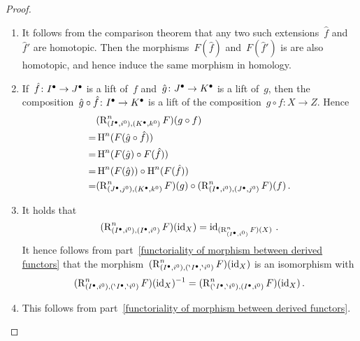 \begin{proof}
  \leavevmode
  \begin{enumerate}
    \item
      It follows from the comparison theorem that any two such extensions~$\hat{f}$ and~$\hat{f}'$ are homotopic.
      Then the morphisms~$F(\hat{f})$ and~$F(\hat{f}')$ is are also homotopic, and hence induce the same morphism in homology.
    \item
      If~$\hat{f} \colon I^\bullet \to J^\bullet$ is a lift of~$f$ and~$\hat{g} \colon J^\bullet \to K^\bullet$ is a lift of~$g$, then the composition~$\hat{g} \circ \hat{f} \colon I^\bullet \to K^\bullet$ is a lift of the composition~$g \circ f \colon X \to Z$.
      Hence
      \begin{align*}
         &{}  (\operatorname{R}^n_{(I^\bullet,i^0), (K^\bullet,k^0)} F)(g \circ f)  \\
        =&{}  \operatorname{H}^n( F(\hat{g} \circ \hat{f}) ) \\
        =&{}  \operatorname{H}^n( F(\hat{g}) \circ F(\hat{f}) )  \\
        =&{}  \operatorname{H}^n( F(\hat{g}) ) \circ \operatorname{H}^n( F(\hat{f}) ) \\
        =&{}  (\operatorname{R}^n_{(J^\bullet,j^0), (K^\bullet,k^0)} F)(g)
              \circ
              (\operatorname{R}^n_{(I^\bullet,i^0), (J^\bullet,j^0)} F)(f)  \,.
      \end{align*}
    \item
      It holds that
      \[
        (\operatorname{R}^n_{(I^\bullet,i^0), (I^\bullet, i^0)} F)(\operatorname{id}_X) 
        =
        \operatorname{id}_{(\operatorname{R}^n_{(I^\bullet,i^0)} F)(X)} \,.
      \]
      It hence follows from part~\ref*{functoriality of morphism between derived functors} that the morphism~$(\operatorname{R}^n_{(I^\bullet,i^0), ({}^{\backprime}I^\bullet, {}^{\backprime} i^0)} F)(\operatorname{id}_X)$ is an isomorphism with
      \[
          (\operatorname{R}^n_{(I^\bullet,i^0), ({}^{\backprime}I^\bullet, {}^{\backprime} i^0)} F)(\operatorname{id}_X)^{-1}
        = (\operatorname{R}^n_{({}^{\backprime}I^\bullet, {}^{\backprime} i^0), (I^\bullet,i^0)} F)(\operatorname{id}_X) \,.
      \]
    \item
      This follows from part~\ref*{functoriality of morphism between derived functors}.
    \qedhere
  \end{enumerate}
\end{proof}










